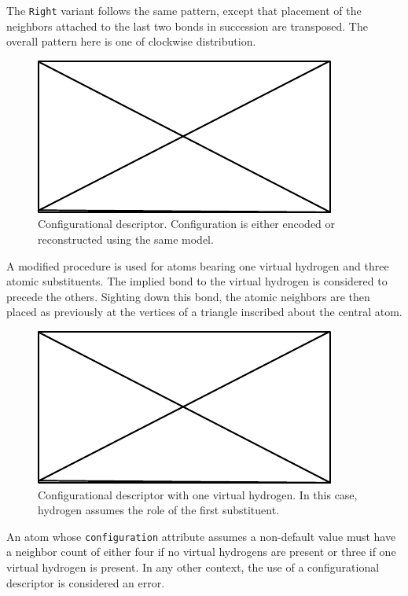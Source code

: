 \documentclass{article}
\def\ttt{\texttt}
\begin{document}
The \ttt{Right} variant follows the same pattern, except that placement of the neighbors attached to the last two bonds in succession are transposed. The overall pattern here is one of clockwise distribution.

\begin{figure}
    \centering
    \includegraphics{filler}
    \caption{Configurational descriptor. Configuration is either encoded or reconstructed using the same model.}
    \label{fig:configurational-descriptor}
\end{figure}

A modified procedure is used for atoms bearing one virtual hydrogen and three atomic substituents. The implied bond to the virtual hydrogen is considered to precede the others. Sighting down this bond, the atomic neighbors are then placed as previously at the vertices of a triangle inscribed about the central atom.

\begin{figure}
    \centering
    \includegraphics{filler}
    \caption{Configurational descriptor with one virtual hydrogen. In this case, hydrogen assumes the role of the first substituent.}
    \label{fig:configurational-descriptor-vh}
\end{figure}

An atom whose \ttt{configuration} attribute assumes a non-default value must have a neighbor count of either four if no virtual hydrogens are present or three if one virtual hydrogen is present. In any other context, the use of a configurational descriptor is considered an error.
\end{document}
